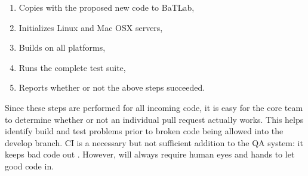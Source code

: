 \begin{enumerate}
    \item Copies \Cyclus with the proposed new code to BaTLab,
    \item Initializes Linux and Mac OSX servers,
    \item Builds \Cyclus on all platforms,
    \item Runs the complete \Cyclus test suite, 
    \item Reports whether or not the above steps succeeded.
\end{enumerate}

Since these steps are performed for all incoming code, it is easy for the 
\Cyclus core team to determine whether or not an individual pull request 
actually works. This helps identify build and test problems prior to 
broken code being allowed into the develop branch. \gls{CI} is a necessary 
but not sufficient addition to the \Cyclus \gls{QA}
system: it keeps bad code out \Cyclus. However, \Cyclus will always
require human eyes and hands to let good code in.
